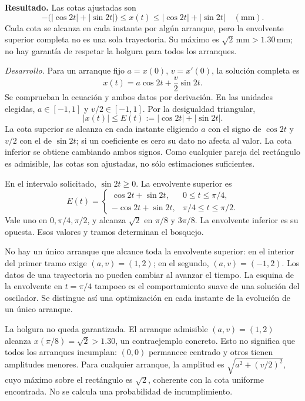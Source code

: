 \noindent\textbf{Resultado.} Las cotas ajustadas son
\[
-\bigl(|\cos2t|+|\sin2t|\bigr)\le x(t)\le
|\cos2t|+|\sin2t|\quad(\mathrm{mm}).
\]
Cada cota se alcanza en cada instante por algún arranque, pero la envolvente superior completa no es una sola trayectoria. Su máximo es \(\sqrt2\,\mathrm{mm}>1.30\,\mathrm{mm}\); no hay garantía de respetar la holgura para todos los arranques.

\noindent\textit{Desarrollo.} Para un arranque fijo \(a=x(0)\), \(v=x'(0)\), la solución completa es
\[
x(t)=a\cos2t+\frac v2\sin2t.
\]
Se comprueban la ecuación y ambos datos por derivación. En las unidades elegidas, \(a\in[-1,1]\) y \(v/2\in[-1,1]\). Por la desigualdad triangular,
\[
|x(t)|\le E(t):=|\cos2t|+|\sin2t|.
\]
La cota superior se alcanza en cada instante eligiendo \(a\) con el signo de \(\cos2t\) y \(v/2\) con el de \(\sin2t\); si un coeficiente es cero su dato no afecta al valor. La cota inferior se obtiene cambiando ambos signos. Como cualquier pareja del rectángulo es admisible, las cotas son ajustadas, no sólo estimaciones suficientes.

En el intervalo solicitado, \(\sin2t\ge0\). La envolvente superior es
\[
E(t)=\begin{cases}\cos2t+\sin2t,&0\le t\le\pi/4,\\-\cos2t+\sin2t,&\pi/4\le t\le\pi/2.\end{cases}
\]
Vale uno en \(0,\pi/4,\pi/2\), y alcanza \(\sqrt2\) en \(\pi/8\) y \(3\pi/8\). La envolvente inferior es su opuesta. Esos valores y tramos determinan el bosquejo.

No hay un único arranque que alcance toda la envolvente superior: en el interior del primer tramo exige \((a,v)=(1,2)\); en el segundo, \((a,v)=(-1,2)\). Los datos de una trayectoria no pueden cambiar al avanzar el tiempo. La esquina de la envolvente en \(t=\pi/4\) tampoco es el comportamiento suave de una solución del oscilador. Se distingue así una optimización en cada instante de la evolución de un único arranque.

La holgura no queda garantizada. El arranque admisible \((a,v)=(1,2)\) alcanza \(x(\pi/8)=\sqrt2>1.30\), un contraejemplo concreto. Esto no significa que todos los arranques incumplan: \((0,0)\) permanece centrado y otros tienen amplitudes menores. Para cualquier arranque, la amplitud es \(\sqrt{a^2+(v/2)^2}\), cuyo máximo sobre el rectángulo es \(\sqrt2\), coherente con la cota uniforme encontrada. No se calcula una probabilidad de incumplimiento.
